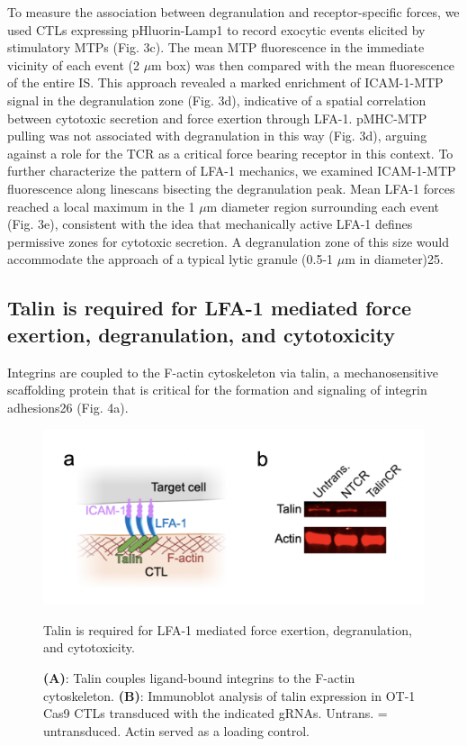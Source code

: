 To measure the association between degranulation and receptor-specific forces, we used CTLs expressing pHluorin-Lamp1 to record exocytic events elicited by stimulatory MTPs (Fig. 3c). The mean MTP fluorescence in the immediate vicinity of each event (2 $\mu$m box) was then compared with the mean fluorescence of the entire IS. This approach revealed a marked enrichment of ICAM-1-MTP signal in the degranulation zone (Fig. 3d), indicative of a spatial correlation between cytotoxic secretion and force exertion through LFA-1. pMHC-MTP pulling was not associated with degranulation in this way (Fig. 3d), arguing against a role for the TCR as a critical force bearing receptor in this context. To further characterize the pattern of LFA-1 mechanics, we examined ICAM-1-MTP fluorescence along linescans bisecting the degranulation peak. Mean LFA-1 forces reached a local maximum in the 1 $\mu$m diameter region surrounding each event (Fig. 3e), consistent with the idea that mechanically active LFA-1 defines permissive zones for cytotoxic secretion. A degranulation zone of this size would accommodate the approach of a typical lytic granule (0.5-1 $\mu$m in diameter)25. 

\subsection{Talin is required for LFA-1 mediated force exertion, degranulation, and cytotoxicity}
Integrins are coupled to the F-actin cytoskeleton via talin, a mechanosensitive scaffolding protein that is critical for the formation and signaling of integrin adhesions26 (Fig. 4a).  

\begin{figure}[htbp]
	\centering
	\includegraphics[width=1.0\columnwidth]{../figures/chapter3/fig4model.png}
	\caption{Talin is required for LFA-1 mediated force exertion, degranulation, and
cytotoxicity.}
	\caption*{\textbf{(A)}: Talin couples ligand-bound integrins to the F-actin cytoskeleton. \textbf{(B)}: Immunoblot analysis of talin expression in OT-1 Cas9 CTLs transduced with the indicated gRNAs. Untrans. = untransduced. Actin served as a loading control.}
	\label{fig:fig4model}
\end{figure} 

